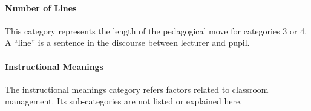 \documentclass[conference]{IEEEtran}
\begin{document}
  \paragraph{Number of Lines}
  This category represents the length
  of the pedagogical move for categories 3 or 4. A ``line'' is a sentence in
  the discourse between lecturer and pupil.
  \paragraph{Instructional Meanings} The instructional meanings category
  refers factors related to classroom management. Its sub-categories are not
  listed or explained here.
\end{document}
